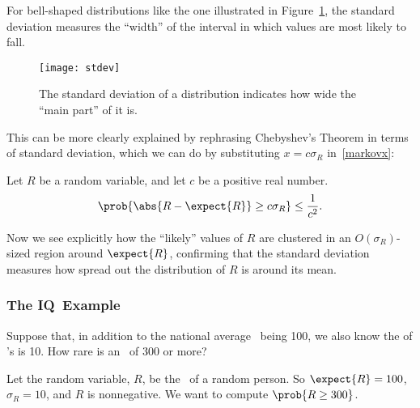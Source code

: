 For bell-shaped distributions like the one illustrated in
Figure~\ref{fig:stdev}, the standard deviation measures the ``width''
of the interval in which values are most likely to fall.
\begin{figure}
  \centerline{\texttt{[image: stdev]}}
  \caption{The standard deviation of a distribution indicates how wide the
    ``main part'' of it is.}
  \label{fig:stdev}
\end{figure}
This can be more clearly explained by rephrasing Chebyshev's Theorem
in terms of standard deviation, which we can do by substituting $x = c
\sigma_R$ in~\eqref{markovx}:
\begin{corollary}\label{cor:cheby}
Let $R$ be a random variable, and let $c$ be a positive real number.
\begin{equation}\label{markovcexp}
\prob{\abs{R - \expect{R}} \geq c \sigma_R} \leq \frac{1}{c^2}.
\end{equation}
\end{corollary}
Now we see explicitly how the ``likely'' values of $R$ are clustered
in an $O(\sigma_R)$-sized region around $\expect{R}$, confirming that
the standard deviation measures how spread out the distribution of $R$
is around its mean.

\iffalse
\begin{proof}
  Substituting $x = c \sigma_R$ in~\eqref{markovx} gives:
  \begin{displaymath}
    \prob{\card{R - \expect{R}} \geq c \sigma_R}
    \leq
    \frac{\variance{R}}{(c \sigma_R)^2}
    =  \frac{\sigma_R^2}{(c \sigma_R)^2}
    = \frac{1}{c^2}.
  \end{displaymath}


\end{proof}

\fi

\subsubsection{The IQ\ Example}\label{IQsec}

Suppose that, in addition to the national average \idx{\IQ}\ being 100, we
also know the  of \IQ's is 10.  How rare is an
\IQ\ of 300 or more?

Let the random variable, $R$, be the \IQ\ of a random person.  So
$\expect{R} = 100$, $\sigma_R = 10$, and $R$ is nonnegative.  We want
to compute $\prob{R \geq 300}$.

